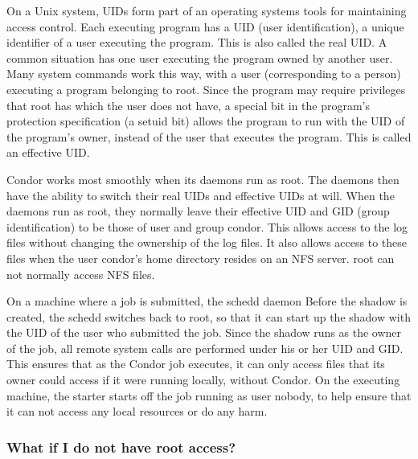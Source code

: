 
On a Unix system,
UIDs form part of an operating systems tools for maintaining
access control.
Each executing program has a UID (user identification), a
unique identifier of a user executing the program.
This is also called the real UID.
A common situation has one user executing the program owned
by another user.
Many system commands work this way, with a user (corresponding
to a person) executing a program belonging to root.
Since the program may require privileges that root has which
the user does not have, a special bit in the program's
protection specification (a setuid bit) allows the program
to run with the UID of the program's owner, instead of the
user that executes the program.
This is called an effective UID.


Condor works most smoothly when its daemons run as root.
The daemons then have the ability to switch their real UIDs and
effective UIDs at will.
When the daemons run as root,
they normally leave their effective UID and GID (group identification)
to be those of user and group condor.
This allows access to the log files without
changing the ownership of the log files.
It also allows access to these files when
the user condor's home directory resides on an NFS server.
root can not normally access NFS files.

On a machine where a job is submitted,
the schedd daemon
Before the shadow is created, the schedd
switches back to root, so that it can start up the shadow with the UID
of the user who submitted the job.  Since the shadow runs as the owner
of the job, all remote system calls are performed under his or her UID
and GID.  This ensures that as the Condor job executes, it can only
access files that its owner could access if it were running locally,
without Condor.  On the executing machine, the starter starts off the
job running as user nobody, to help ensure that it can not access any
local resources or do any harm.  

\subsubsection{\label{sec:norootaccess}What if I do not have root access?}

